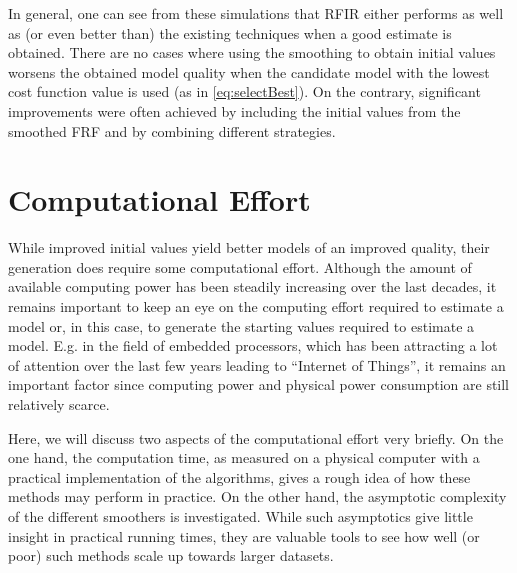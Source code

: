 In general, one can see from these simulations that \gls{RFIR} either performs as well as (or even better than) the existing techniques when a good estimate is obtained.
There are no cases where using the smoothing to obtain initial values worsens the obtained model quality when the candidate model with the lowest cost function value is used (as in \eqref{eq:selectBest}).
On the contrary, significant improvements were often achieved by including the initial values from the smoothed FRF and by combining different strategies.

\section{Computational Effort}\label{sec:initvals:computation}
While improved initial values yield better models of an improved quality, their generation does require some computational effort.
Although the amount of available computing power has been steadily increasing over the last decades, it remains important to keep an eye on the computing effort required to estimate a model or, in this case, to generate the starting values required to estimate a model.
E.g. in the field of embedded processors, which has been attracting a lot of attention over the last few years leading to ``Internet of Things'', it remains an important factor since computing power and physical power consumption are still relatively scarce.

Here, we will discuss two aspects of the computational effort very briefly.
On the one hand, the computation time, as measured on a physical computer with a practical implementation of the algorithms, gives a rough idea of how these methods may perform in practice.
On the other hand, the asymptotic complexity of the different smoothers is investigated. 
While such asymptotics give little insight in practical running times, they are valuable tools to see how well (or poor) such methods scale up towards larger datasets.

